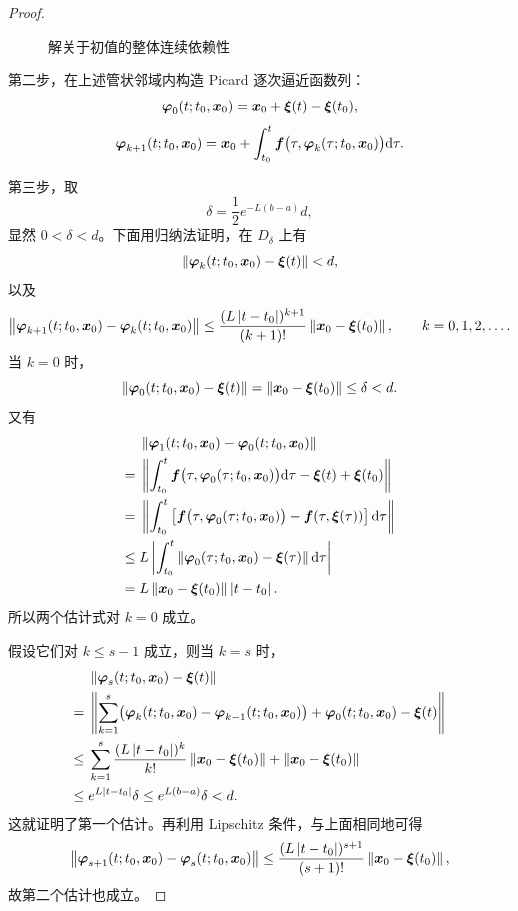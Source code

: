 \begin{proof}
\begin{figure}[htbp]
		\caption{解关于初值的整体连续依赖性}
		\label{fig:解关于初值的整体连续依赖性}
	\end{figure}

	第二步，在上述管状邻域内构造 Picard 逐次逼近函数列：
	\[
		\boldsymbol{\varphi}_0(t;t_0,\boldsymbol{x}_0)
		=\boldsymbol{x}_0+\boldsymbol{\xi}(t)-\boldsymbol{\xi}(t_0),
	\]
	\[
		\boldsymbol{\varphi}_{k+1}(t;t_0,\boldsymbol{x}_0)
		=\boldsymbol{x}_0+
		\int_{t_0}^t
		\boldsymbol{f}\bigl(
		\tau,\boldsymbol{\varphi}_k(\tau;t_0,\boldsymbol{x}_0)
		\bigr)\mathrm{d}\tau.
	\]

	第三步，取
	\[
		\delta=\dfrac{1}{2}e^{-L(b-a)}d,
	\]
	显然 $0<\delta<d$。下面用归纳法证明，在 $D_\delta$ 上有
	\[
		\left\| 
		\boldsymbol{\varphi}_k(t;t_0,\boldsymbol{x}_0)-\boldsymbol{\xi}(t)
		 \right\|<d,
	\]
	以及
	\[
		\left\| 
		\boldsymbol{\varphi}_{k+1}(t;t_0,\boldsymbol{x}_0)
		-\boldsymbol{\varphi}_k(t;t_0,\boldsymbol{x}_0)
		 \right\|
		\leq
		\dfrac{(L\left| t-t_0 \right|)^{k+1}}{(k+1)!}
		\left\| \boldsymbol{x}_0-\boldsymbol{\xi}(t_0) \right\|,
		\qquad k=0,1,2,\ldots.
	\]
	当 $k=0$ 时，
	\[
		\left\| 
		\boldsymbol{\varphi}_0(t;t_0,\boldsymbol{x}_0)-\boldsymbol{\xi}(t)
		 \right\|
		=\left\| \boldsymbol{x}_0-\boldsymbol{\xi}(t_0) \right\|
		\leq\delta<d.
	\]
	又有
	\begin{align*}
		&\left\| 
		\boldsymbol{\varphi}_1(t;t_0,\boldsymbol{x}_0)
		-\boldsymbol{\varphi}_0(t;t_0,\boldsymbol{x}_0)
		 \right\|\\
		={}&\left\| 
		\int_{t_0}^t
		\boldsymbol{f}\bigl(\tau,\boldsymbol{\varphi}_0(\tau;t_0,\boldsymbol{x}_0)\bigr)
		\mathrm{d}\tau-\boldsymbol{\xi}(t)+\boldsymbol{\xi}(t_0)
		 \right\|\\
		={}&\left\| 
		\int_{t_0}^t
		\left[
		\boldsymbol{f}\bigl(\tau,\boldsymbol{\varphi}_0(\tau;t_0,\boldsymbol{x}_0)\bigr)
		-\boldsymbol{f}(\tau,\boldsymbol{\xi}(\tau))
		\right]\mathrm{d}\tau
		 \right\|\\
		\leq{}&L\left| 
		\int_{t_0}^t
		\left\| 
		\boldsymbol{\varphi}_0(\tau;t_0,\boldsymbol{x}_0)-\boldsymbol{\xi}(\tau)
		 \right\|\mathrm{d}\tau
		 \right|\\
		={}&L\left\| \boldsymbol{x}_0-\boldsymbol{\xi}(t_0) \right\|\left| t-t_0 \right|.
	\end{align*}
	所以两个估计式对 $k=0$ 成立。

	假设它们对 $k\leq s-1$ 成立，则当 $k=s$ 时，
	\begin{align*}
		&\left\| 
		\boldsymbol{\varphi}_s(t;t_0,\boldsymbol{x}_0)-\boldsymbol{\xi}(t)
		 \right\|\\
		={}&\left\| 
		\sum_{k=1}^s
		\bigl(
		\boldsymbol{\varphi}_k(t;t_0,\boldsymbol{x}_0)
		-\boldsymbol{\varphi}_{k-1}(t;t_0,\boldsymbol{x}_0)
		\bigr)
		+\boldsymbol{\varphi}_0(t;t_0,\boldsymbol{x}_0)-\boldsymbol{\xi}(t)
		 \right\|\\
		\leq{}&
		\sum_{k=1}^s
		\dfrac{(L\left| t-t_0 \right|)^k}{k!}
		\left\| \boldsymbol{x}_0-\boldsymbol{\xi}(t_0) \right\|
		+\left\| \boldsymbol{x}_0-\boldsymbol{\xi}(t_0) \right\|\\
		\leq{}&e^{L\left| t-t_0 \right|}\delta
		\leq e^{L(b-a)}\delta<d.
	\end{align*}
	这就证明了第一个估计。再利用 Lipschitz 条件，与上面相同地可得
	\[
		\left\| 
		\boldsymbol{\varphi}_{s+1}(t;t_0,\boldsymbol{x}_0)
		-\boldsymbol{\varphi}_s(t;t_0,\boldsymbol{x}_0)
		 \right\|
		\leq
		\dfrac{(L\left| t-t_0 \right|)^{s+1}}{(s+1)!}
		\left\| \boldsymbol{x}_0-\boldsymbol{\xi}(t_0) \right\|,
	\]
	故第二个估计也成立。


\end{proof}
